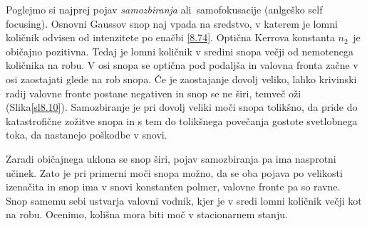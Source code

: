 Poglejmo si najprej pojav \textit{samozbiranja }ali\textit{\ }samofokusacije
(anlgeško self focusing). Osnovni Gaussov snop naj vpada na sredstvo,
v katerem je lomni količnik odvisen od intenzitete po enačbi \ref{8.74}.
Optična Kerrova konstanta $n_{2\text{ }}$je običajno pozitivna. Tedaj
je lomni količnik v sredini snopa večji od nemotenega količnika na
robu. V osi snopa se optična pod podaljša in valovna fronta začne
v osi zaostajati glede na rob snopa. Če je zaostajanje dovolj veliko,
lahko krivinski radij valovne fronte postane negativen in snop se
ne širi, temveč oži (Slika\ref{sl8.10}). Samozbiranje je pri dovolj
veliki moči snopa tolikšno, da pride do katastrofične zožitve snopa
in s tem do tolikšnega povečanja gostote svetlobnega toka, da nastanejo
poškodbe v snovi.

Zaradi običajnega uklona se snop širi, pojav samozbiranja pa ima nasprotni
učinek. Zato je pri primerni moči snopa možno, da se oba pojava po
velikosti izenačita in snop ima v snovi konstanten polmer, valovne
fronte pa so ravne. Snop samemu sebi ustvarja valovni vodnik, kjer
je v sredi lomni količnik večji kot na robu. Ocenimo, kolišna mora
biti moč v stacionarnem stanju.

